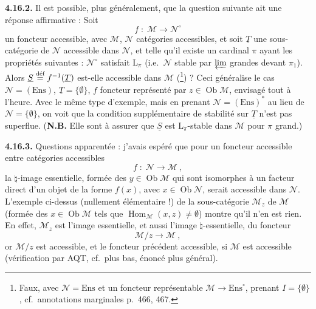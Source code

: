 \documentclass[11pt]{article}
\newcommand{\msp}[1]{\marginpar{\footnotesize [#1]}}
\newcommand{\Ob}{\operatorname{Ob}}
\newcommand{\Hom}{\operatorname{Hom}}
\newcommand{\Ens}{\mathrm{Ens}}
\newcommand{\defeq}{\overset{\text{\upshape déf}}{=}}
\begin{document}
\textbf{4.16.2.} Il est possible, plus généralement, que la question suivante ait une réponse affirmative : Soit
\[
f \;:\; \mathcal{M} \longrightarrow \mathcal{N}^\circ
\]
un foncteur accessible, avec $\mathcal{M}$, $\mathcal{N}$ catégories accessibles, et soit $\underline{T}$ une sous-catégorie de $\mathcal{N}$ accessible dans $\mathcal{N}$, et telle qu'il existe un cardinal $\pi$ ayant les propriétés suivantes : $\mathcal{N}^\circ$ satisfait $\mathrm{L}_\pi$ (i.e.\ $\mathcal{N}$ stable par $\varprojlim$ grandes devant $\pi_1$). Alors $\underline{S} \defeq f^{-1}(\underline{T})$ est-elle accessible dans $\mathcal{M}$ (\footnote[191]{Faux, avec $\mathcal{N} = \Ens$ et un foncteur représentable $\mathcal{M} \longrightarrow \Ens^\circ$, prenant $I = \{\emptyset\}$, cf.\ annotations marginales p.~466, 467.}) ? Ceci généralise le cas $\mathcal{N} = (\Ens)$, $\underline{T} = \{\emptyset\}$, $f$ foncteur représenté par $z \in \Ob\mathcal{M}$, envisagé tout à l'heure. Avec le même type d'exemple, mais en prenant $\mathcal{N} = (\Ens)^*$
\msp{469}
au lieu de $\mathcal{N} = \{\emptyset\}$, on voit que la condition supplémentaire de stabilité sur $\underline{T}$ n'est pas
superflue. (\textbf{N.B.} Elle sont à assurer que $\underline{S}$ est $\mathrm{L}_\pi$-stable dans $\mathcal{M}$ pour $\pi$ grand.) %

\textbf{4.16.3.} Questions apparentée : j'avais espéré que pour un foncteur accessible entre catégories accessibles %
\[
f \;:\; \mathcal{N} \longrightarrow \mathcal{M}\ ,
\]
la $\natural$-image essentielle, formée des $y \in \Ob\mathcal{M}$ qui sont isomorphes à un facteur direct d'un objet de la forme $f(x)$, avec $x \in \Ob\mathcal{N}$, serait accessible dans $\mathcal{N}$. L'exemple ci-dessus (nullement élémentaire !) de la sous-catégorie $\mathcal{M}_z$ de $\mathcal{M}$ (formée des $x \in \Ob\mathcal{M}$ tels que $\Hom_{\mathcal{M}}(x,z) \neq \emptyset$) montre qu'il n'en est rien. En effet, $\mathcal{M}_z$ est l'image essentielle, et aussi l'image $\natural$-essentielle, du foncteur
\[
\mathcal{M}/z \longrightarrow \mathcal{M}\ ,
\]
or $\mathcal{M}/z$ est accessible, et le foncteur précédent accessible, si $\mathcal{M}$ est accessible (vérification par AQT, cf.\ plus bas, énoncé plus général).

\msp{470}
\end{document}
